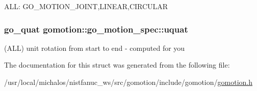 A\-L\-L\-: G\-O\-\_\-\-M\-O\-T\-I\-O\-N\-\_\-\-J\-O\-I\-N\-T,L\-I\-N\-E\-A\-R,C\-I\-R\-C\-U\-L\-A\-R \hypertarget{structgomotion_1_1go__motion__spec_af21779ad35fe55e85d91bf8e133def52}{
\subsubsection[{uquat}]{\setlength{\rightskip}{0pt plus 5cm}go\-\_\-quat gomotion\-::go\-\_\-motion\-\_\-spec\-::uquat}}\label{structgomotion_1_1go__motion__spec_af21779ad35fe55e85d91bf8e133def52}
(A\-L\-L) unit rotation from start to end -\/ computed for you 

The documentation for this struct was generated from the following file\-:\begin{DoxyCompactItemize}
\item 
/usr/local/michalos/nistfanuc\-\_\-ws/src/gomotion/include/gomotion/\hyperlink{gomotion_8h}{gomotion.\-h}\end{DoxyCompactItemize}
